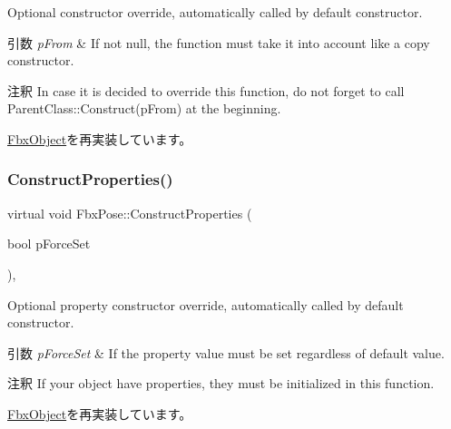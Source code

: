 Optional constructor override, automatically called by default constructor. 
\begin{DoxyParams}{引数}
{\em p\+From} & If not null, the function must take it into account like a copy constructor. \\
\hline
\end{DoxyParams}
\begin{DoxyRemark}{注釈}
In case it is decided to override this function, do not forget to call Parent\+Class\+::\+Construct(p\+From) at the beginning. 
\end{DoxyRemark}


\hyperlink{class_fbx_object_a313503bc645af3fdceb4a99ef5cea7eb}{Fbx\+Object}を再実装しています。

\mbox{\label{class_fbx_pose_a56784b0847fb1e83c02afe991c40581a}} 
\subsubsection{\texorpdfstring{Construct\+Properties()}{ConstructProperties()}}
{\footnotesize\ttfamily virtual void Fbx\+Pose\+::\+Construct\+Properties (\begin{DoxyParamCaption}\item[{bool}]{p\+Force\+Set }\end{DoxyParamCaption})\hspace{0.3cm}{\ttfamily [protected]}, {\ttfamily [virtual]}}

Optional property constructor override, automatically called by default constructor. 
\begin{DoxyParams}{引数}
{\em p\+Force\+Set} & If the property value must be set regardless of default value. \\
\hline
\end{DoxyParams}
\begin{DoxyRemark}{注釈}
If your object have properties, they must be initialized in this function. 
\end{DoxyRemark}


\hyperlink{class_fbx_object_ad44f814323dc1b5e78bff1bfc608b4bb}{Fbx\+Object}を再実装しています。

\mbox{\label{class_fbx_pose_a5fa5e19c330ff196bc7e8cdd152c223f}} 
